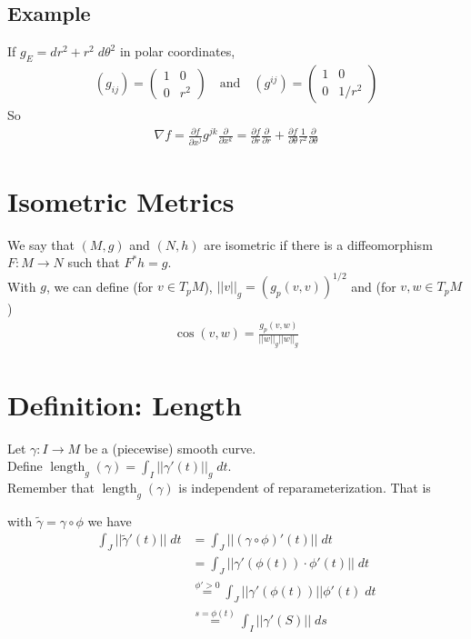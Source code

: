 \documentclass[11pt]{article}
\begin{document}
\subsection*{Example}
\label{sec:org2a4bae6}
If \(g_{E}=dr^{2}+r^{2}\;d\theta^{2}\) in polar coordinates,\\
\begin{align*}
  (g_{ij})=
  \begin{pmatrix}
    1 & 0 \\
    0 & r^{2}
  \end{pmatrix}\quad\text{and}{\quad}
  (g^{ij})=
  \begin{pmatrix}
    1 & 0 \\
    0 & 1/r^{2}
  \end{pmatrix}
\end{align*}
So\\
\begin{align*}
  \nabla f
  =\frac{\partial f}{\partial x^{j}}g^{jk}\frac{\partial}{\partial x^{k}}
  =\frac{\partial f}{\partial r}\frac{\partial}{\partial r}+\frac{\partial f}{\partial \theta}\frac{1}{r^{2}}\frac{\partial}{\partial\theta}
\end{align*}
\section*{Isometric Metrics}
\label{sec:org15a1891}
We say that \((M,g)\) and \((N,h)\) are isometric if there is a diffeomorphism \(F:M\to N\) such that \(F^{*}h=g\).\\
With \(g\), we can define (for \(v\in T_{p}M\)), \(||v||_{g}=(g_{p}(v,v))^{1/2}\) and (for \(v,w\in T_{p}M\))\\
\begin{align*}
  \cos(v,w)=
  \frac{g_{p}(v,w)}{||w||_{g}||w||_{g}}
\end{align*}
\section*{Definition: Length}
\label{sec:org57e9cd3}
Let \(\gamma:I\to M\) be a (piecewise) smooth curve.\\
Define \(\operatorname{length}_{g}(\gamma)=\int_{I}||\gamma'(t)||_{g}\;dt\).\\
Remember that \(\operatorname{length}_{g}(\gamma)\) is independent of reparameterization. That is\\
with \(\tilde{\gamma}=\gamma\circ\phi\) we have\\
\begin{align*}
  \int_{J}||\tilde{\gamma}'(t)||\;dt
  &=\int_{J}||(\gamma\circ\phi)'(t)||\;dt \\
  &=\int_{J}||\gamma'(\phi(t))\cdot\phi'(t)||\;dt \\
  &\overset{\phi'>0}{=}\int_{J}||\gamma'(\phi(t))||\phi'(t)\;dt \\
  &\overset{s=\phi(t)}{=}\int_{I}||\gamma'(S)||\;ds
\end{align*}
\end{document}
